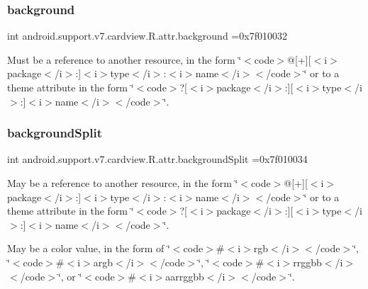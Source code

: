 \subsubsection{\texorpdfstring{background}{background}}
{\footnotesize\ttfamily int android.\+support.\+v7.\+cardview.\+R.\+attr.\+background =0x7f010032\hspace{0.3cm}{\ttfamily [static]}}

Must be a reference to another resource, in the form \char`\"{}$<$code$>$@\mbox{[}+\mbox{]}\mbox{[}$<$i$>$package$<$/i$>$\+:\mbox{]}$<$i$>$type$<$/i$>$\+:$<$i$>$name$<$/i$>$$<$/code$>$\char`\"{} or to a theme attribute in the form \char`\"{}$<$code$>$?\mbox{[}$<$i$>$package$<$/i$>$\+:\mbox{]}\mbox{[}$<$i$>$type$<$/i$>$\+:\mbox{]}$<$i$>$name$<$/i$>$$<$/code$>$\char`\"{}. \mbox{\label{classandroid_1_1support_1_1v7_1_1cardview_1_1R_1_1attr_afaa578ea45659f58ba2319e9ff85da78}} 
\subsubsection{\texorpdfstring{background\+Split}{backgroundSplit}}
{\footnotesize\ttfamily int android.\+support.\+v7.\+cardview.\+R.\+attr.\+background\+Split =0x7f010034\hspace{0.3cm}{\ttfamily [static]}}

May be a reference to another resource, in the form \char`\"{}$<$code$>$@\mbox{[}+\mbox{]}\mbox{[}$<$i$>$package$<$/i$>$\+:\mbox{]}$<$i$>$type$<$/i$>$\+:$<$i$>$name$<$/i$>$$<$/code$>$\char`\"{} or to a theme attribute in the form \char`\"{}$<$code$>$?\mbox{[}$<$i$>$package$<$/i$>$\+:\mbox{]}\mbox{[}$<$i$>$type$<$/i$>$\+:\mbox{]}$<$i$>$name$<$/i$>$$<$/code$>$\char`\"{}. 

May be a color value, in the form of \char`\"{}$<$code$>$\#$<$i$>$rgb$<$/i$>$$<$/code$>$\char`\"{}, \char`\"{}$<$code$>$\#$<$i$>$argb$<$/i$>$$<$/code$>$\char`\"{}, \char`\"{}$<$code$>$\#$<$i$>$rrggbb$<$/i$>$$<$/code$>$\char`\"{}, or \char`\"{}$<$code$>$\#$<$i$>$aarrggbb$<$/i$>$$<$/code$>$\char`\"{}. \mbox{\label{classandroid_1_1support_1_1v7_1_1cardview_1_1R_1_1attr_a391ae99ec962c0c68e929d5171bf5468}} 
